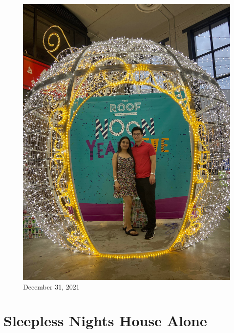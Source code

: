 \documentclass[
]{book}
\begin{document}
\begin{figure}
\centering
\includegraphics[width=5.20833in,height=\textheight]{mimages/15 12-31-2021.jpg}
\caption{December 31, 2021}
\end{figure}

\hypertarget{sleepless-nights-house-alone}{%
\chapter{Sleepless Nights House Alone}\label{sleepless-nights-house-alone}}
\end{document}
